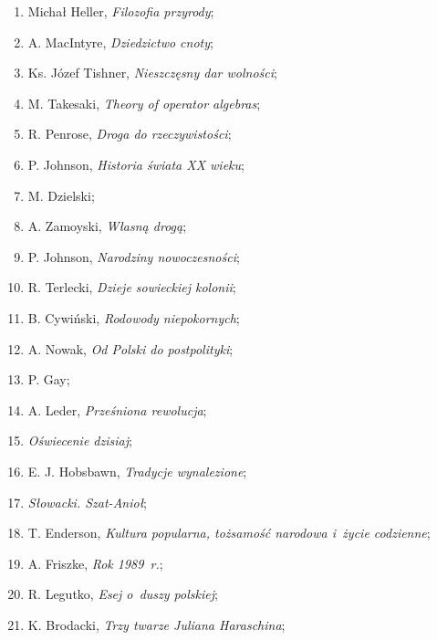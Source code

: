 \documentclass[a4paper,11pt]{article}
\begin{document}
\begin{enumerate}
\item Michał Heller, \textit{Filozofia przyrody};

\item A. MacIntyre, \textit{Dziedzictwo cnoty};

\item Ks. Józef Tishner, \textit{Nieszczęsny dar wolności};

\item M. Takesaki, \textit{Theory of operator algebras};

\item R. Penrose, \textit{Droga do rzeczywistości};

\item P. Johnson, \textit{Historia świata XX wieku};

\item M. Dzielski;

\item A. Zamoyski, \textit{Własną drogą};

\item P. Johnson, \textit{Narodziny nowoczesności};

\item R. Terlecki, \textit{Dzieje sowieckiej kolonii};

\item B. Cywiński, \textit{Rodowody niepokornych};

\item A. Nowak, \textit{Od Polski do postpolityki};

\item P. Gay;

\item A. Leder, \textit{Prześniona rewolucja};

\item \textit{Oświecenie dzisiaj};

\item E. J. Hobsbawn, \textit{Tradycje wynalezione};

\item \textit{Słowacki. Szat-Anioł};

\item T. Enderson, \textit{Kultura popularna, tożsamość narodowa i~życie
    codzienne};

\item A. Friszke, \textit{Rok 1989~r.};

\item R. Legutko, \textit{Esej o~duszy polskiej};

\item K. Brodacki, \textit{Trzy twarze Juliana Haraschina};


\end{enumerate}
\end{document}
